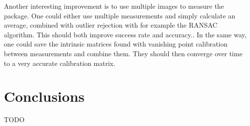 Another interesting improvement is to use multiple images to measure the package.
One could either use multiple measurements and simply calculate an average, combined with outlier rejection with for example the RANSAC algorithm.
This should both improve success rate and accuracy..
In the same way, one could save the intrinsic matrices found with vanishing point calibration between measurements and combine them.
They should then converge over time to a very accurate calibration matrix. \cite{fischler1981random}


\section{Conclusions}
TODO










